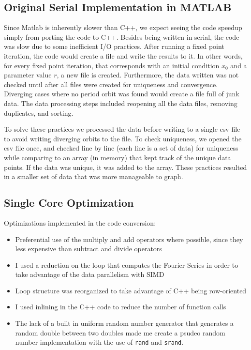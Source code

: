 \documentclass[12pt]{article}
\newcommand{\bi}{\begin{itemize}}
\newcommand{\ei}{\end{itemize}}
\begin{document}
\subsection{Original Serial Implementation in MATLAB}
\hspace{5mm} Since Matlab is inherently slower than C++, we expect seeing the code
speedup simply from porting the code to C++. Besides being written in serial, the code was slow due to some
inefficient I/O practices. After running a fixed point iteration, the
code would create a file and write the results to it. In other words,
for every fixed point iteration, that corresponds with an initial
condition $x_0$ and a parameter value $r$, a new file is
created. Furthermore, the data written was not checked until after all
files were created for uniqueness and convergence. Diverging cases
where no period orbit was found would create a file full of junk
data. The data processing steps included reopening all the data files,
removing duplicates, and sorting. 

To solve these practices we processed the data before writing to a
single csv file to avoid writing diverging orbits to the file. To
check uniqueness, we opened the csv file once, and checked line by line
(each line is a set of data) for uniqueness while comparing to an
array (in memory) that kept track of the unique data points. If the
data was unique, it was added to the array. These practices resulted
in a smaller set of data that was more manageable to graph.

\subsection{Single Core Optimization}
Optimizations implemented in the code conversion:
\bi
\item Preferential use of the  multiply and add operators where possible, since
they less expensive than subtract and divide operators
\item I used a reduction on the loop that computes the Fourier Series
  in order to take advantage of the data parallelism with SIMD
\item Loop structure was reorganized to take advantage of C++ being row-oriented
\item I used inlining in the C++ code to reduce the number of function calls
\item The lack of a built in uniform random number generator that generates a random
double between two doubles made me create a psudeo random number
implementation with the use of \texttt{rand} and \texttt{srand}.

\ei
\end{document}
